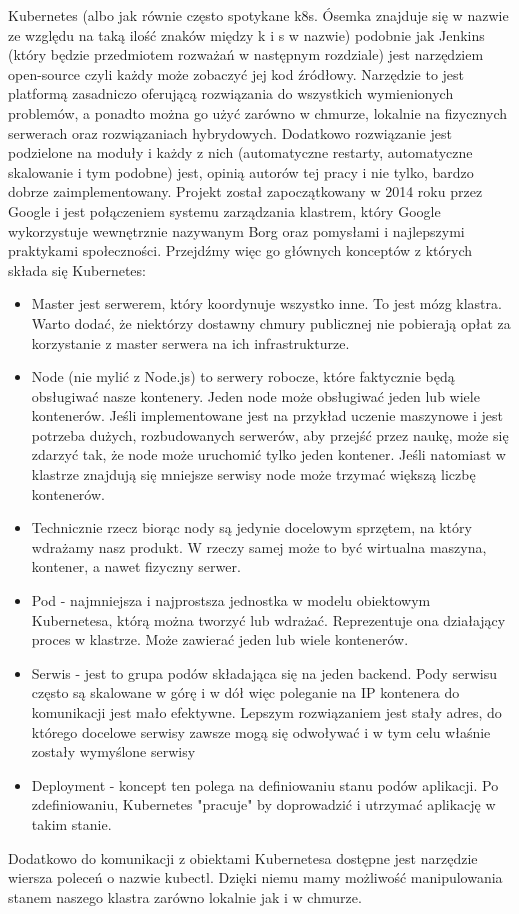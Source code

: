 Kubernetes (albo jak równie często spotykane k8s. Ósemka znajduje się w nazwie ze względu na taką ilość znaków między k i s w nazwie) podobnie jak Jenkins (który będzie przedmiotem rozważań w następnym rozdziale) jest narzędziem open-source czyli każdy może zobaczyć jej kod źródłowy. Narzędzie to jest platformą zasadniczo oferującą rozwiązania do wszystkich wymienionych problemów, a ponadto można go użyć zarówno w chmurze, lokalnie na fizycznych serwerach oraz rozwiązaniach hybrydowych. Dodatkowo rozwiązanie jest podzielone na moduły i każdy z nich (automatyczne restarty, automatyczne skalowanie i tym podobne) jest, opinią autorów tej pracy i nie tylko, bardzo dobrze zaimplementowany. 
Projekt został zapoczątkowany w 2014 roku przez Google i jest połączeniem systemu zarządzania klastrem, który Google wykorzystuje wewnętrznie nazywanym Borg oraz pomysłami i najlepszymi praktykami społeczności.
Przejdźmy więc go głównych konceptów z których składa się Kubernetes:
\begin{itemize}
    \item Master jest serwerem, który koordynuje wszystko inne. To jest mózg klastra. Warto dodać, że niektórzy dostawny chmury publicznej nie pobierają opłat za korzystanie z master serwera na ich infrastrukturze. 
    \item Node (nie mylić z Node.js) to serwery robocze, które faktycznie będą obsługiwać nasze kontenery. Jeden node może obsługiwać jeden lub wiele kontenerów. Jeśli implementowane jest na przykład uczenie maszynowe i jest potrzeba dużych, rozbudowanych serwerów, aby przejść przez naukę, może się zdarzyć tak, że node może uruchomić tylko jeden kontener. Jeśli natomiast w klastrze znajdują się mniejsze serwisy node może trzymać większą liczbę kontenerów.
    \item Technicznie rzecz biorąc nody są jedynie docelowym sprzętem, na który wdrażamy nasz produkt. W rzeczy samej może to być wirtualna maszyna, kontener, a nawet fizyczny serwer. 
    \item Pod - najmniejsza i najprostsza jednostka w modelu obiektowym Kubernetesa, którą można tworzyć lub wdrażać. Reprezentuje ona działający proces w klastrze. Może zawierać jeden lub wiele kontenerów.
    \item Serwis - jest to grupa podów składająca się na jeden backend. Pody serwisu często są skalowane w górę i w dół więc poleganie na IP kontenera do komunikacji jest mało efektywne. Lepszym rozwiązaniem jest stały adres, do którego docelowe serwisy zawsze mogą się odwoływać i w tym celu właśnie zostały wymyślone serwisy
    \item Deployment - koncept ten polega na definiowaniu stanu podów aplikacji. Po zdefiniowaniu, Kubernetes "pracuje" by doprowadzić i utrzymać aplikację w takim stanie.
\end{itemize}

Dodatkowo do komunikacji z obiektami Kubernetesa dostępne jest narzędzie wiersza poleceń o nazwie kubectl. Dzięki niemu mamy możliwość manipulowania stanem naszego klastra zarówno lokalnie jak i w chmurze.


